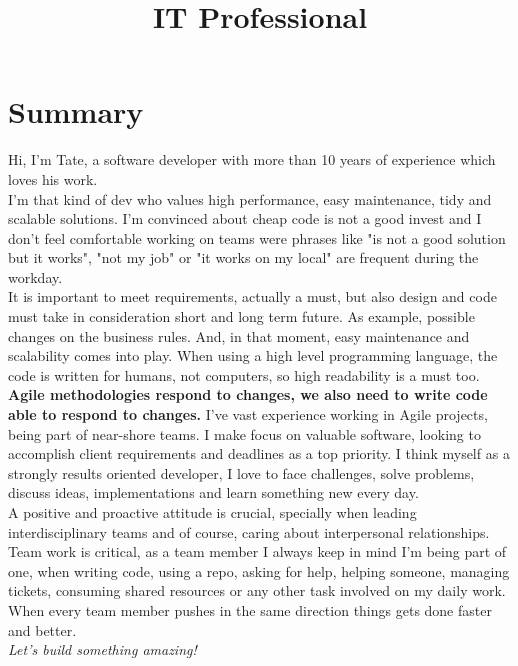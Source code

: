\documentclass[11pt,a4paper,sans]{moderncv}        %
\title{IT Professional}                               %
\begin{document}
\makecvtitle

\section{Summary}

Hi, I'm Tate, a software developer with more than 10 years of experience which loves his work.\\
I'm that kind of dev who values high performance, easy maintenance, tidy and scalable solutions.
I'm convinced about cheap code is not a good invest and I don't feel comfortable working on teams were phrases like "is not a
good solution but it works", "not my job" or "it works on my local" are frequent during the workday.\\
It is important to meet requirements, actually a must, but also design and code must take in consideration short and long term future.
As example, possible changes on the business rules. And, in that moment, easy maintenance and scalability comes into play.
When using a high level programming language, the code is written for humans, not computers, so high readability is a must too.
\textbf{Agile methodologies respond to changes, we also need to write code able to respond to changes.}
I've vast experience working in Agile projects, being part of near-shore teams.
I make focus on valuable software, looking to accomplish client requirements and deadlines as a top priority.
I think myself as a strongly results oriented developer, I love to face challenges, solve problems, discuss ideas, implementations and learn something new every day.\\
A positive and proactive attitude is crucial, specially when leading interdisciplinary teams and of course,
caring about interpersonal relationships.\\
Team work is critical, as a team member I always keep in mind I'm being part of one, when writing code, using a repo,
asking for help, helping someone, managing tickets, consuming shared resources or any other task involved on my daily work.
When every team member pushes in the same direction things gets done faster and better.\\
\textit{Let's build something amazing!}\\
\end{document}
